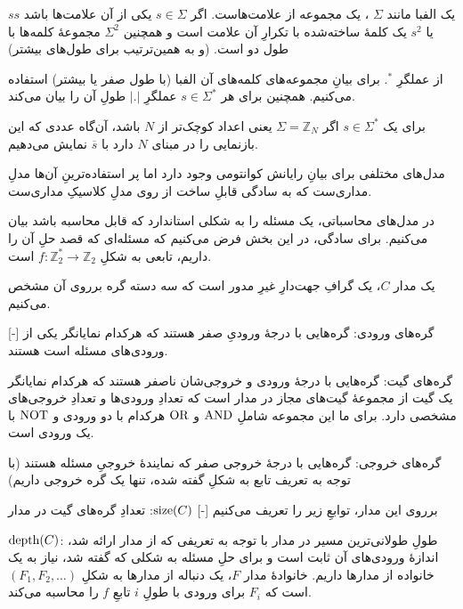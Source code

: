 

یک الفبا مانند 
\(\Sigma\)
، یک مجموعه از علامت‌هاست.
اگر 
\(s \in \Sigma\)
یکی از آن علامت‌ها باشد
\(s s\)
یا
\(s^2\)
یک کلمهٔ ساخته‌شده با تکرارِ آن علامت است و همچنین 
\(\Sigma^2\)
 مجموعهٔ کلمه‌ها با طول دو است. (و به همین‌ترتیب برای طول‌های بیشتر)

از عملگرِ 
\(.^*\)
برای بیانِ مجموعه‌های کلمه‌های آن الفبا (با طول صفر یا بیشتر) استفاده می‌کنیم. همچنین برای هر 
\(s \in \Sigma^*\)
عملگرِ \(|.|\) طولِ آن را بیان می‌کند.

برای یک 
\(s \in \Sigma^*\)
اگر 
\(\Sigma = \mathbb{Z}_N\)
یعنی اعداد کوچک‌تر از \(N\) باشد، آن‌گاه عددی که این بازنمایی را در مبنای \(N\) دارد با
\(\overline{s}\)
نمایش می‌دهیم.

مدل‌های مختلفی برای بیانِ رایانش کوانتومی وجود دارد اما پر استفاده‌ترینِ آن‌ها مدلِ مداری‌ست که به سادگی قابلِ ساخت از روی مدلِ کلاسیکِ مداری‌ست.

در مدل‌های محاسباتی، یک مسئله را به شکلی استاندارد که قابل محاسبه باشد بیان می‌کنیم. برای سادگی، در این بخش فرض می‌کنیم که مسئله‌ای که قصد حلِ آن را داریم، تابعی به شکلِ
\(f: \mathbb{Z}_2^* \to \mathbb{Z}_2\)
است.

 
یک مدار \(C\)، یک گرافِ جهت‌دارِ غیرِ مدور است که سه دسته گره برروی آن مشخص می‌کنیم.

[-]
 گره‌های ورودی: گره‌هایی با درجهٔ ورودیِ صفر هستند که هرکدام نمایانگر یکی از ورودی‌های مسئله است
هستند.

 گره‌های گیت: گره‌هایی با درجهٔ ورودی و خروجی‌شان ناصفر هستند که هرکدام نمایانگر یک گیت از مجموعهٔ گیت‌های مجاز در مدار است که تعدادِ ورودی‌ها و تعدادِ خروجی‌های مشخصی دارد. برای ما این مجموعه شاملِ 
\(\operatorname{AND}\)
و 
\(\operatorname{OR}\)
هرکدام با دو ورودی و 
\(\operatorname{NOT}\)
 با یک ورودی است.

 گره‌های خروجی: گره‌هایی با درجهٔ خروجی صفر که نمایندهٔ خروجیِ مسئله هستند (با توجه به تعریف تابع به شکلِ گفته شده، تنها یک گره خروجی داریم)


برروی این مدار، توابعِ زیر را تعریف می‌کنیم
[-]
\(\operatorname{size}(C)\):
تعدادِ گره‌های گیت در مدار

\(\operatorname{depth}(C)\):
طولِ طولانی‌ترین مسیر در مدار
با توجه به تعریفی که از مدار ارائه شد، اندازهٔ ورودی‌های آن ثابت است و برای حلِ مسئله به شکلی که گفته شد، نیاز به یک خانواده از مدارها داریم. خانوادهٔ مدار \(F\)، یک دنباله از مدارها به شکلِ
\((F_1, F_2, \dots)\)
است که \(F_i\) برای ورودی با طولِ \(i\) تابعِ \(f\) را محاسبه می‌کند.


